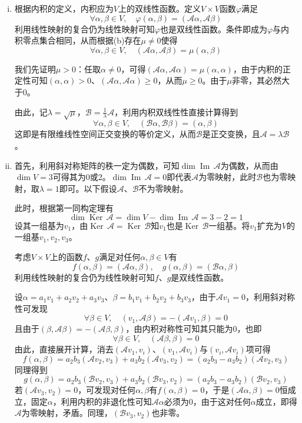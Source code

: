 \documentclass[a4paper,UTF8,fontset=windows,AutoFakeBold]{ctexart}
\DeclareMathOperator{\im}{Im\,}
\DeclareMathOperator{\Ker}{Ker\,}
\newcommand*{\ma}{\mathcal{A}}
\newcommand*{\mb}{\mathcal{B}}
\begin{document}
\begin{enumerate}
\begin{enumerate}
\begin{enumerate}[(i)]
            \item 根据内积的定义，内积应为$V$上的双线性函数。定义$V\times V$函数$\varphi$满足
            $$\forall\alpha,\beta\in V,\quad\varphi(\alpha,\beta)=(\ma\alpha,\ma\beta)$$
            利用线性映射的复合仍为线性映射可知$\varphi$也是双线性函数。条件即成为$\varphi$与内积零点集合相同，从而根据(b)存在$\mu\ne0$使得
            $$\forall\alpha,\beta\in V,\quad(\ma\alpha,\ma\beta)=\mu(\alpha,\beta)$$

            我们先证明$\mu>0$：任取$\alpha\ne0$，可得$(\ma\alpha,\ma\alpha)=\mu(\alpha,\alpha)$，由于内积的正定性可知$(\alpha,\alpha)>0$、$(\ma\alpha,\ma\alpha)\ge0$，从而$\mu\ge0$。由于$\mu$非零，其必然大于0。

            由此，记$\lambda=\sqrt\mu$，$\mb=\frac{1}{\lambda}\ma$，利用内积双线性性直接计算得到
            $$\forall\alpha,\beta\in V,\quad(\mb\alpha,\mb\beta)=(\alpha,\beta)$$
            这即是有限维线性空间正交变换的等价定义，从而$\mb$是正交变换，且$\ma=\lambda\mb$。

            \item 
            首先，利用斜对称矩阵的秩一定为偶数，可知$\dim\im\ma$为偶数，从而由$\dim V=3$可得其为0或2。$\dim\im\ma=0$即代表$\ma$为零映射，此时$\mb$也为零映射，取$\lambda=1$即可。以下假设$\ma$、$\mb$不为零映射。
            
            此时，根据第一同构定理有
            $$\dim\Ker\ma=\dim V-\dim\im\ma=3-2=1$$
            设其一组基为$v_1$，由$\Ker\ma=\Ker\mb$知$v_1$也是$\Ker\mb$一组基。将$v_1$扩充为$V$的一组基$v_1,v_2,v_3$。
            
            考虑$V\times V$上的函数$f$、$g$满足对任何$\alpha,\beta\in V$有
            $$f(\alpha,\beta)=(\ma\alpha,\beta),\quad g(\alpha,\beta)=(\mb\alpha,\beta)$$
            利用线性映射的复合仍为线性映射可知$f$、$g$是双线性函数。

            设$\alpha=a_1v_1+a_2v_2+a_3v_3$、$\beta=b_1v_1+b_2v_2+b_3v_3$，由于$\ma v_1=0$，利用斜对称性可发现
            $$\forall\beta\in V,\quad(v_1,\ma\beta)=-(\ma v_1,\beta)=0$$
            且由于$(\beta,\ma\beta)=-(\ma\beta,\beta)$，由内积对称性可知其只能为0，也即
            $$\forall\beta\in V,\quad(\ma\beta,\beta)=0$$
            由此，直接展开计算，消去$(\ma v_1,v_i)$、$(v_1,\ma v_i)$与$(v_i,\ma v_i)$项可得
            $$f(\alpha,\beta)=a_2b_3(\ma v_2,v_3)+a_3b_2(\ma v_3,v_2)=(a_2b_3-a_3b_2)(\ma v_2,v_3)$$
            同理得到
            $$g(\alpha,\beta)=a_2b_3(\mb v_2,v_3)+a_3b_2(\mb v_3,v_2)=(a_2b_3-a_3b_2)(\mb v_2,v_3)$$
            若$(\ma v_3,v_2)=0$，可发现对任何$\alpha,\beta$有$f(\alpha,\beta)=0$，于是$(\ma\alpha,\beta)=0$恒成立，固定$\alpha$，利用内积的非退化性可知$\ma\alpha$必须为0，由于这对任何$\alpha$成立，即得$\ma$为零映射，矛盾。同理，$(\mb v_3,v_2)$也非零。


\end{enumerate}
\end{enumerate}
\end{enumerate}
\end{document}
